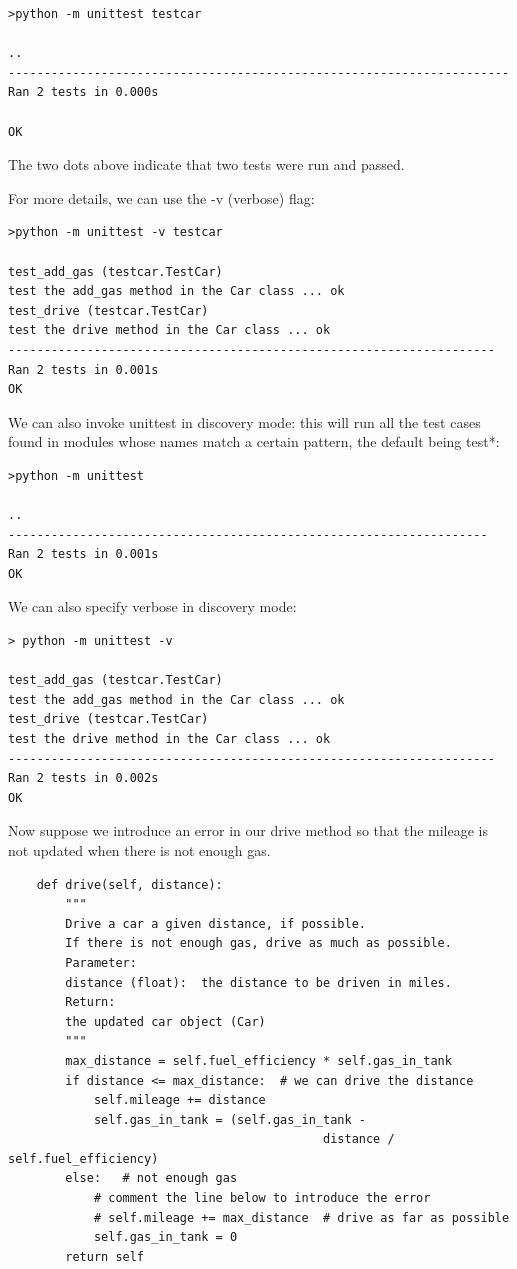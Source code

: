 \documentclass{article}
\begin{document}
\begin{lstlisting}
>python -m unittest testcar

..
----------------------------------------------------------------------
Ran 2 tests in 0.000s
 
OK
\end{lstlisting}

The two dots above indicate that two tests were run and passed.

For more details, we can use the -v (verbose) flag:

\begin{lstlisting}
>python -m unittest -v testcar
 
test_add_gas (testcar.TestCar)
test the add_gas method in the Car class ... ok
test_drive (testcar.TestCar)
test the drive method in the Car class ... ok
--------------------------------------------------------------------
Ran 2 tests in 0.001s
OK
\end{lstlisting}

We can also invoke unittest in discovery mode:  this will run all the test cases found in modules whose names match a certain pattern, the default being test*:

\begin{lstlisting}
>python -m unittest

..
-------------------------------------------------------------------
Ran 2 tests in 0.001s
OK
\end{lstlisting}
 
We can also specify verbose in discovery mode:

\begin{lstlisting}
> python -m unittest -v
 
test_add_gas (testcar.TestCar)
test the add_gas method in the Car class ... ok
test_drive (testcar.TestCar)
test the drive method in the Car class ... ok
--------------------------------------------------------------------
Ran 2 tests in 0.002s
OK
\end{lstlisting}

Now suppose we introduce an error in our drive method so that the mileage is not updated when there is not enough gas.

\begin{lstlisting}
    def drive(self, distance):
        """
        Drive a car a given distance, if possible.
        If there is not enough gas, drive as much as possible.
        Parameter:
        distance (float):  the distance to be driven in miles.
        Return:
        the updated car object (Car)
        """
        max_distance = self.fuel_efficiency * self.gas_in_tank
        if distance <= max_distance:  # we can drive the distance
            self.mileage += distance
            self.gas_in_tank = (self.gas_in_tank - 
                                            distance / self.fuel_efficiency)
        else:   # not enough gas
            # comment the line below to introduce the error
            # self.mileage += max_distance  # drive as far as possible
            self.gas_in_tank = 0
        return self
\end{lstlisting}
 
\end{document}
